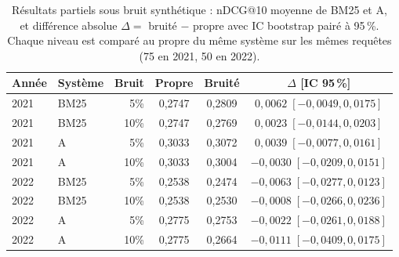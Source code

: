 \documentclass{article}
\begin{document}
\begin{table}[t]
  \caption{Résultats partiels sous bruit synthétique : nDCG@10 moyenne de BM25 et A, et différence absolue $\Delta =$ bruité $-$ propre avec IC bootstrap pairé à 95\,\%. Chaque niveau est comparé au propre du même système sur les mêmes requêtes (75 en 2021, 50 en 2022).}
  \label{tab:noise-partial}
  \centering
  \small
  \begin{tabular}{llrccc}
    \toprule
    Année & Système & Bruit & Propre & Bruité & $\Delta$ [IC 95\,\%] \\
    \midrule
    2021 & BM25 & 5\% & 0{,}2747 & 0{,}2809 & $0{,}0062\;[-0{,}0049, 0{,}0175]$ \\
    2021 & BM25 & 10\% & 0{,}2747 & 0{,}2769 & $0{,}0023\;[-0{,}0144, 0{,}0203]$ \\
    2021 & A & 5\% & 0{,}3033 & 0{,}3072 & $0{,}0039\;[-0{,}0077, 0{,}0161]$ \\
    2021 & A & 10\% & 0{,}3033 & 0{,}3004 & $-0{,}0030\;[-0{,}0209, 0{,}0151]$ \\
    \midrule
    2022 & BM25 & 5\% & 0{,}2538 & 0{,}2474 & $-0{,}0063\;[-0{,}0277, 0{,}0123]$ \\
    2022 & BM25 & 10\% & 0{,}2538 & 0{,}2530 & $-0{,}0008\;[-0{,}0266, 0{,}0236]$ \\
    2022 & A & 5\% & 0{,}2775 & 0{,}2753 & $-0{,}0022\;[-0{,}0261, 0{,}0188]$ \\
    2022 & A & 10\% & 0{,}2775 & 0{,}2664 & $-0{,}0111\;[-0{,}0409, 0{,}0175]$ \\
    \bottomrule
  \end{tabular}
\end{table}
\end{document}
